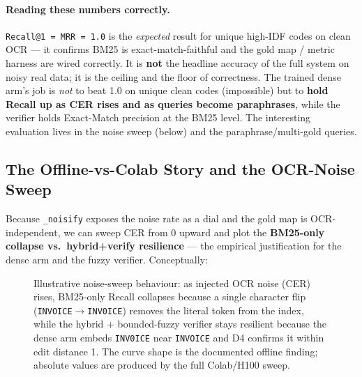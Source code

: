 \documentclass[12pt,a4paper]{article}
\begin{document}
\paragraph{Reading these numbers correctly.} \texttt{Recall@1 = MRR = 1.0} is the \emph{expected} result for unique high-IDF codes on clean OCR --- it confirms BM25 is exact-match-faithful and the gold map / metric harness are wired correctly. It is \textbf{not} the headline accuracy of the full system on noisy real data; it is the ceiling and the floor of correctness. The trained dense arm's job is \emph{not} to beat 1.0 on unique clean codes (impossible) but to \textbf{hold Recall up as CER rises and as queries become paraphrases}, while the verifier holds Exact-Match precision at the BM25 level. The interesting evaluation lives in the noise sweep (below) and the paraphrase/multi-gold queries.

\subsection{The Offline-vs-Colab Story and the OCR-Noise Sweep}

Because \texttt{\_noisify} exposes the noise rate as a dial and the gold map is OCR-independent, we can sweep CER from 0 upward and plot the \textbf{BM25-only collapse vs.\ hybrid+verify resilience} --- the empirical justification for the dense arm and the fuzzy verifier. Conceptually:

\begin{figure}[H]
\centering
{}
\caption{Illustrative noise-sweep behaviour: as injected OCR noise (CER) rises, BM25-only Recall collapses because a single character flip (\texttt{INVOICE}$\rightarrow$\texttt{INV0ICE}) removes the literal token from the index, while the hybrid + bounded-fuzzy verifier stays resilient because the dense arm embeds \texttt{INV0ICE} near \texttt{INVOICE} and D4 confirms it within edit distance 1. The curve shape is the documented offline finding; absolute values are produced by the full Colab/H100 sweep.}
\label{fig:noise_sweep}
\end{figure}
\end{document}

